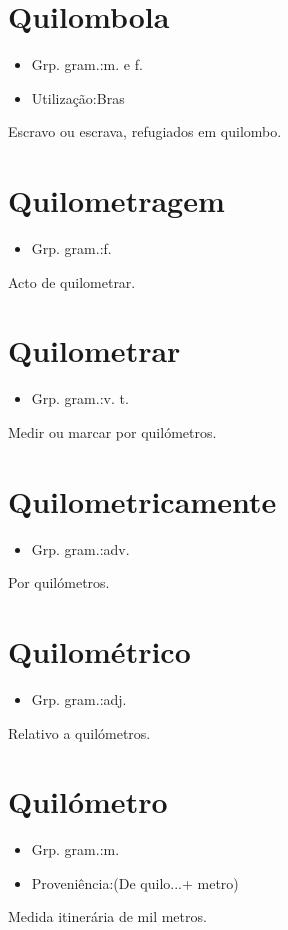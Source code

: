 \section{Quilombola}
\begin{itemize}
\item {Grp. gram.:m.  e  f.}
\end{itemize}
\begin{itemize}
\item {Utilização:Bras}
\end{itemize}
Escravo ou escrava, refugiados em quilombo.
\section{Quilometragem}
\begin{itemize}
\item {Grp. gram.:f.}
\end{itemize}
Acto de quilometrar.
\section{Quilometrar}
\begin{itemize}
\item {Grp. gram.:v. t.}
\end{itemize}
Medir ou marcar por quilómetros.
\section{Quilometricamente}
\begin{itemize}
\item {Grp. gram.:adv.}
\end{itemize}
Por quilómetros.
\section{Quilométrico}
\begin{itemize}
\item {Grp. gram.:adj.}
\end{itemize}
Relativo a quilómetros.
\section{Quilómetro}
\begin{itemize}
\item {Grp. gram.:m.}
\end{itemize}
\begin{itemize}
\item {Proveniência:(De \textunderscore quilo...\textunderscore  + \textunderscore metro\textunderscore )}
\end{itemize}
Medida itinerária de mil metros.
